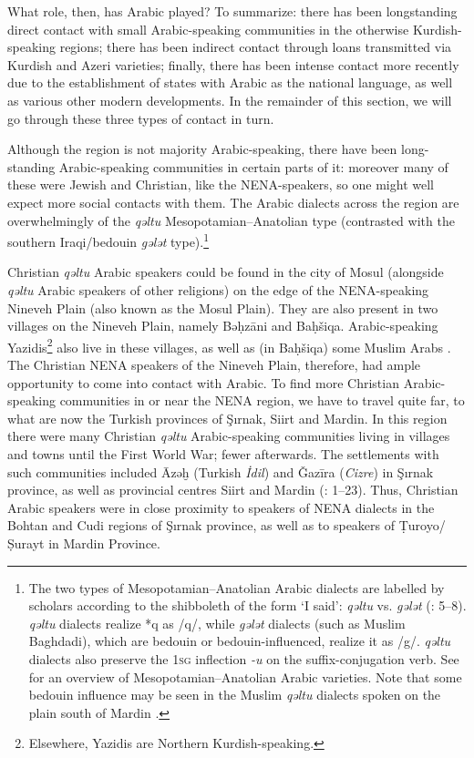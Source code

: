 \documentclass[output=paper]{langsci/langscibook}
\begin{document}
What role, then, has Arabic played? To summarize: there has been longstanding direct contact with small Arabic-speaking communities in the otherwise Kurdish-speaking regions; there has been indirect contact through loans transmitted via Kurdish and Azeri varieties; finally, there has been intense contact more recently due to the establishment of states with Arabic as the national language, as well as various other modern developments. In the remainder of this section, we will go through these three types of contact in turn.

Although the region is not majority Arabic-speaking, there have been long-standing Arabic-speaking communities in certain parts of it: moreover many of these were Jewish and Christian, like the NENA-speakers, so one might well expect more social contacts with them. The Arabic dialects across the region are overwhelmingly of the \textit{qəltu} Mesopotamian–Anatolian type (contrasted with the southern Iraqi/bedouin \textit{gələt} type).\footnote{The two types of Mesopotamian–Anatolian Arabic dialects are labelled by scholars according to the shibboleth of the form ‘I said’: \textit{qəltu} vs. \textit{gələt} (\citealt{Blanc1964}: 5–8). \textit{qəltu} dialects realize *q as /q/, while \textit{gələt} dialects (such as Muslim Baghdadi), which are bedouin or bedouin-influenced, realize it as /g/. \textit{qəltu} dialects also preserve the 1\textsc{sg} inflection \textit{-u} on the suffix-conjugation verb. See \citet{Talay2011} for an overview of Mesopotamian--Anatolian Arabic varieties. Note that some bedouin influence may be seen in the Muslim \textit{qəltu} dialects spoken on the plain south of Mardin \citep[30]{Jastrow1978}.}

Christian \textit{qəltu} Arabic speakers could be found in the city of Mosul (alongside \textit{qəltu} Arabic speakers of other religions) on the edge of the NENA-speaking Nineveh Plain (also known as the Mosul Plain). They are also present in two villages on the Nineveh Plain, namely Bəḥzāni and Baḥšiqa. Arabic-speaking Yazidis\footnote{Elsewhere, Yazidis are Northern Kurdish-speaking.} also live in these villages, as well as (in Baḥšiqa) some Muslim Arabs \citep[24]{Jastrow1978}. The Christian NENA speakers of the Nineveh Plain, therefore, had ample opportunity to come into contact with Arabic. To find more Christian Arabic-speaking communities in or near the NENA region, we have to travel quite far, to what are now the Turkish provinces of Şırnak, Siirt and Mardin. In this region there were many Christian \textit{qəltu} Arabic-speaking communities living in villages and towns until the First World War; fewer afterwards. The settlements with such communities included Āzəḫ (Turkish \textit{İdil}) and Ǧazīra (\textit{Cizre}) in Şırnak province, as well as provincial centres Siirt and Mardin (\citealt{Jastrow1978}: 1–23). Thus, Christian Arabic speakers were in close proximity to speakers of NENA dialects in the Bohtan and Cudi regions of Şırnak province, as well as to speakers of Ṭuroyo/Ṣurayt in Mardin Province.
\end{document}
